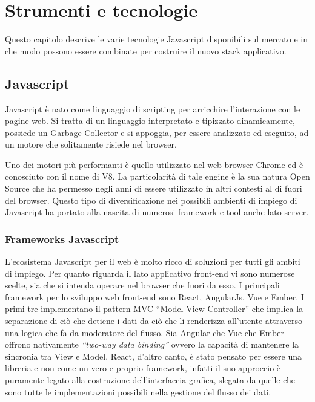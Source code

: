 \chapter{Strumenti e tecnologie}
\label{cha:intro}
\vspace{5mm}
Questo capitolo descrive le varie tecnologie Javascript disponibili sul mercato e in che modo possono essere combinate per costruire il nuovo stack applicativo.

\section{Javascript}\vspace{5mm}

Javascript è nato come linguaggio di scripting per arricchire l'interazione con le pagine web. Si tratta di un linguaggio interpretato e tipizzato dinamicamente, possiede un Garbage Collector\cite{GC} e si appoggia, per essere analizzato ed eseguito, ad un motore che solitamente risiede nel browser.

Uno dei motori più performanti è quello utilizzato nel web browser Chrome ed è conosciuto con il nome di V8\cite{V8}. La particolarità di tale engine è la sua natura Open Source che ha permesso negli anni di essere utilizzato in altri contesti al di fuori del browser. Questo tipo di diversificazione nei possibili ambienti di impiego di Javascript ha portato alla nascita di numerosi framework e tool anche lato server.

\subsection{Frameworks Javascript}\vspace{5mm}

	L’ecosistema Javascript per il web è molto ricco di soluzioni per tutti gli ambiti di impiego. Per quanto riguarda il lato applicativo front-end vi sono numerose scelte, sia che si intenda operare nel browser che fuori da esso. I principali framework per lo sviluppo web front-end sono React\cite{React}, AngularJs\cite{angular}, Vue	\cite{vue} e Ember\cite{ember}. I primi tre implementano il pattern MVC “Model-View-Controller” che implica la separazione di ciò che detiene i dati da ciò che li renderizza all’utente attraverso una logica che fa da moderatore del flusso. Sia Angular che Vue che Ember offrono nativamente \emph{“two-way data binding”} ovvero la capacità di mantenere la sincronia tra View e Model. React, d’altro canto, è stato pensato per essere una libreria e non come un vero e proprio framework, infatti il suo approccio è puramente legato alla costruzione dell’interfaccia grafica, slegata da quelle che sono tutte le implementazioni possibili nella gestione del flusso dei dati. \vspace{5mm}

